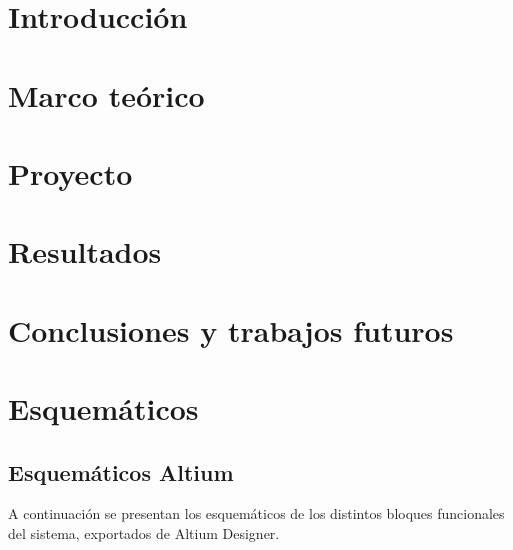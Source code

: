 \documentclass[11pt,a4paper, table, dvipsnames]{report}
\numberwithin{equation}{section}
\begin{document}
\pagebreak

\chapter{Introducción}

\pagebreak

\chapter{Marco teórico}

\pagebreak

\chapter{Proyecto}

\pagebreak

\chapter{Resultados}

\pagebreak

\chapter{Conclusiones y trabajos futuros}

\pagebreak


\chapter{Esquemáticos}

\section{Esquemáticos Altium}
\label{sec:EsquematicosAltium}
A continuación se presentan los esquemáticos de los distintos bloques funcionales del sistema, exportados de Altium Designer. 
\end{document}
